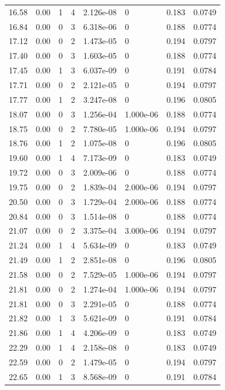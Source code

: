 \documentclass[preview]{standalone}
\begin{document}
{{{\begin{tabular}{L{1.2cm}C{1.2cm} C{0.3cm}C{0.5cm} C{1.4cm}C{1.4cm} C{1.4cm}C{1.4cm}}
  16.58  &  0.00  & 1     &  4 &  2.126e-08  & 0  & 0.183 &  0.0749   \\ 
  16.84  &  0.00  & 0     &  3 &  6.318e-06  & 0  & 0.188 &  0.0774   \\ 
  17.12  &  0.00  & 0     &  2 &  1.473e-05  & 0  & 0.194 &  0.0797   \\ 
  17.40  &  0.00  & 0     &  3 &  1.603e-05  & 0  & 0.188 &  0.0774   \\ 
  17.45  &  0.00  & 1     &  3 &  6.037e-09  & 0  & 0.191 &  0.0784   \\ 
  17.71  &  0.00  & 0     &  2 &  2.121e-05  & 0  & 0.194 &  0.0797   \\ 
  17.77  &  0.00  & 1     &  2 &  3.247e-08  & 0  & 0.196 &  0.0805   \\ 
  18.07  &  0.00  & 0     &  3 &  1.256e-04  & 1.000e-06  & 0.188 &  0.0774   \\ 
  18.75  &  0.00  & 0     &  2 &  7.780e-05  & 1.000e-06  & 0.194 &  0.0797   \\ 
  18.76  &  0.00  & 1     &  2 &  1.075e-08  & 0  & 0.196 &  0.0805   \\ 
  19.60  &  0.00  & 1     &  4 &  7.173e-09  & 0  & 0.183 &  0.0749   \\ 
  19.72  &  0.00  & 0     &  3 &  2.009e-06  & 0  & 0.188 &  0.0774   \\ 
  19.75  &  0.00  & 0     &  2 &  1.839e-04  & 2.000e-06  & 0.194 &  0.0797   \\ 
  20.50  &  0.00  & 0     &  3 &  1.729e-04  & 2.000e-06  & 0.188 &  0.0774   \\ 
  20.84  &  0.00  & 0     &  3 &  1.514e-08  & 0  & 0.188 &  0.0774   \\ 
  21.07  &  0.00  & 0     &  2 &  3.375e-04  & 3.000e-06  & 0.194 &  0.0797   \\ 
  21.24  &  0.00  & 1     &  4 &  5.634e-09  & 0  & 0.183 &  0.0749   \\ 
  21.49  &  0.00  & 1     &  2 &  2.851e-08  & 0  & 0.196 &  0.0805   \\ 
  21.58  &  0.00  & 0     &  2 &  7.529e-05  & 1.000e-06  & 0.194 &  0.0797   \\ 
  21.81  &  0.00  & 0     &  2 &  1.274e-04  & 1.000e-06  & 0.194 &  0.0797   \\ 
  21.81  &  0.00  & 0     &  3 &  2.291e-05  & 0  & 0.188 &  0.0774   \\ 
  21.82  &  0.00  & 1     &  3 &  5.621e-09  & 0  & 0.191 &  0.0784   \\ 
  21.86  &  0.00  & 1     &  4 &  4.206e-09  & 0  & 0.183 &  0.0749   \\ 
  22.29  &  0.00  & 1     &  4 &  2.158e-08  & 0  & 0.183 &  0.0749   \\ 
  22.59  &  0.00  & 0     &  2 &  1.479e-05  & 0  & 0.194 &  0.0797   \\ 
  22.65  &  0.00  & 1     &  3 &  8.568e-09  & 0  & 0.191 &  0.0784   \\ 
\hline 
\end{tabular} 

}}}
\end{document}
